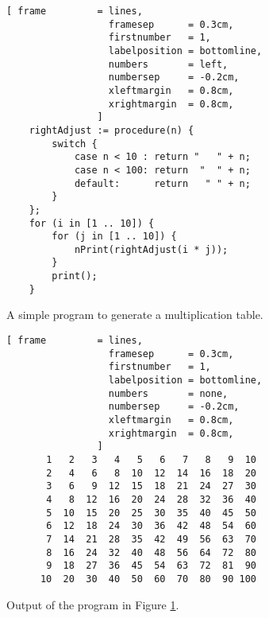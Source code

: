 \begin{figure}[!ht]
\centering
\begin{Verbatim}[ frame         = lines, 
                  framesep      = 0.3cm, 
                  firstnumber   = 1,
                  labelposition = bottomline,
                  numbers       = left,
                  numbersep     = -0.2cm,
                  xleftmargin   = 0.8cm,
                  xrightmargin  = 0.8cm,
                ]
    rightAdjust := procedure(n) {
        switch {
            case n < 10 : return "   " + n;
            case n < 100: return  "  " + n;
            default:      return   " " + n;
        }
    };      
    for (i in [1 .. 10]) {
        for (j in [1 .. 10]) {
            nPrint(rightAdjust(i * j));
        }
        print();
    }
\end{Verbatim}
\vspace*{-0.3cm}
\caption{A simple program to generate a multiplication table.}
\label{fig:multiplication-table.stlx}
\end{figure}

\begin{figure}[!ht]
\centering
\begin{Verbatim}[ frame         = lines, 
                  framesep      = 0.3cm, 
                  firstnumber   = 1,
                  labelposition = bottomline,
                  numbers       = none,
                  numbersep     = -0.2cm,
                  xleftmargin   = 0.8cm,
                  xrightmargin  = 0.8cm,
                ]
       1   2   3   4   5   6   7   8   9  10
       2   4   6   8  10  12  14  16  18  20
       3   6   9  12  15  18  21  24  27  30
       4   8  12  16  20  24  28  32  36  40
       5  10  15  20  25  30  35  40  45  50
       6  12  18  24  30  36  42  48  54  60
       7  14  21  28  35  42  49  56  63  70
       8  16  24  32  40  48  56  64  72  80
       9  18  27  36  45  54  63  72  81  90
      10  20  30  40  50  60  70  80  90 100
\end{Verbatim}
\vspace*{-0.3cm}
\caption{Output of the program in Figure \ref{fig:multiplication-table.stlx}.}
\label{fig:multiplication-table}
\end{figure}

